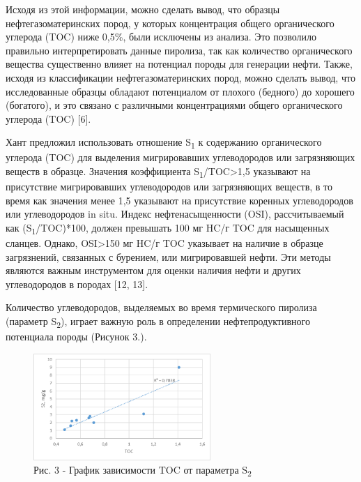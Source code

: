 \begin{multicols}{2}
Исходя из этой информации, можно сделать вывод, что образцы
нефтегазоматеринских пород, у которых концентрация общего органического
углерода (TOC) ниже 0,5\%, были исключены из анализа. Это позволило
правильно интерпретировать данные пиролиза, так как количество
органического вещества существенно влияет на потенциал породы для
генерации нефти. Также, исходя из классификации нефтегазоматеринских
пород, можно сделать вывод, что исследованные образцы обладают
потенциалом от плохого (бедного) до хорошего (богатого), и это связано с
различными концентрациями общего органического углерода (TOC) {[}6{]}.

Хант предложил использовать отношение S\textsubscript{1} к содержанию
органического углерода (TOC) для выделения мигрировавших углеводородов
или загрязняющих веществ в образце. Значения коэффициента
S\textsubscript{1}/TOC\textgreater1,5 указывают на присутствие
мигрировавших углеводородов или загрязняющих веществ, в то время как
значения менее 1,5 указывают на присутствие коренных углеводородов или
углеводородов in situ. Индекс нефтенасыщенности (OSI), рассчитываемый
как (S\textsubscript{1}/TOC)*100, должен превышать 100 мг HC/г TOC для
насыщенных сланцев. Однако, OSI\textgreater150 мг HC/г TOC указывает на
наличие в образце загрязнений, связанных с бурением, или мигрировавшей
нефти. Эти методы являются важным инструментом для оценки наличия нефти
и других углеводородов в породах {[}12, 13{]}.

Количество углеводородов, выделяемых во время термического пиролиза
(параметр S\textsubscript{2}), играет важную роль в определении
нефтепродуктивного потенциала породы (Рисунок 3.).
\end{multicols}

\begin{figure}[H]
	\centering
	\includegraphics[width=0.6\textwidth]{assets/1260}
	\caption*{Рис. 3 - График зависимости TOC от параметра S\textsubscript{2}}
\end{figure}

